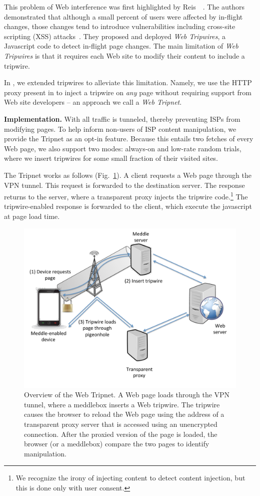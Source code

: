 This problem of Web interference was first highlighted by Reis~\etal~\cite{reis:tripwires}. 
The authors demonstrated that although a small percent of users were affected by in-flight changes, those changes tend to introduce vulnerabilities including cross-site scripting (XSS) attacks~\cite{reis:tripwires}. 
They proposed and deployed \emph{Web Tripwires}, a Javascript code to detect in-flight page changes. 
The main limitation of \emph{Web Tripwires} is that it requires each Web site to modify their content to include a tripwire.

In \meddle, we extended tripwires to alleviate this limitation. 
Namely, we use the HTTP proxy present in \meddle to inject a tripwire on \emph{any} page 
without requiring support from Web site developers -- an approach we call a \emph{Web Tripnet}.

\noindent\textbf{Implementation.} With \meddle all traffic is tunneled, thereby 
preventing ISPs from modifying pages. To help inform non-users of ISP content 
manipulation, we provide the Tripnet as an opt-in feature. Because this entails 
two fetches of every Web page, we also support two modes: always-on and low-rate random trials, where we 
insert tripwires for some small fraction of their visited sites.

The Tripnet works as follows (Fig.~\ref{fig:tripnet}). A client requests a Web page through the \meddle VPN 
tunnel. This request is forwarded to the destination server. The response returns to 
the \meddle server, where a transparent proxy injects the tripwire code.\footnote{We 
recognize the irony of injecting content to detect content injection, but this is done only with user consent.}
The tripwire-enabled response is forwarded to the client, which execute the javascript at page load time.


\begin{figure}
\centering
\includegraphics[width=0.9\linewidth]{figures/tripnet.pdf}
\caption{Overview of the Web Tripnet. A Web page loads 
through the VPN tunnel, where a meddlebox inserts a Web tripwire. The
tripwire causes the browser to reload the Web page using the address of a
transparent proxy server that is accessed using an unencrypted connection.
After the proxied version of the page is loaded, the browser (or a meddlebox)
compare the two pages to identify manipulation. }
\label{fig:tripnet}
\end{figure}

